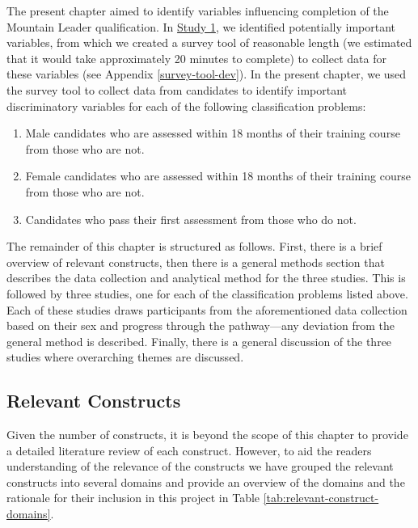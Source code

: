 \documentclass[
  12pt,
  a4paper,
]{book}
\providecommand{\tightlist}{%
  \setlength{\itemsep}{0pt}\setlength{\parskip}{0pt}}
\begin{document}
The present chapter aimed to identify variables influencing completion of the Mountain Leader qualification. In \protect\hyperlink{ml-qualitative}{Study 1}, we identified potentially important variables, from which we created a survey tool of reasonable length (we estimated that it would take approximately 20 minutes to complete) to collect data for these variables (see Appendix \ref{survey-tool-dev}). In the present chapter, we used the survey tool to collect data from candidates to identify important discriminatory variables for each of the following classification problems:

\begin{enumerate}
\def\labelenumi{\arabic{enumi}.}
\tightlist
\item
  Male candidates who are assessed within 18 months of their training course from those who are not.
\item
  Female candidates who are assessed within 18 months of their training course from those who are not.
\item
  Candidates who pass their first assessment from those who do not.
\end{enumerate}

The remainder of this chapter is structured as follows. First, there is a brief overview of relevant constructs, then there is a general methods section that describes the data collection and analytical method for the three studies. This is followed by three studies, one for each of the classification problems listed above. Each of these studies draws participants from the aforementioned data collection based on their sex and progress through the pathway---any deviation from the general method is described. Finally, there is a general discussion of the three studies where overarching themes are discussed.

\hypertarget{pra-relevant-constructs}{%
\subsection{Relevant Constructs}\label{pra-relevant-constructs}}

Given the number of constructs, it is beyond the scope of this chapter to provide a detailed literature review of each construct. However, to aid the readers understanding of the relevance of the constructs we have grouped the relevant constructs into several domains and provide an overview of the domains and the rationale for their inclusion in this project in Table \ref{tab:relevant-construct-domains}.
\end{document}
